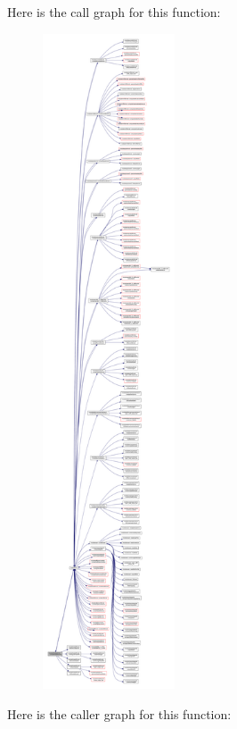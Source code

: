 Here is the call graph for this function\+:\nopagebreak
\begin{figure}[H]
\begin{center}
\leavevmode
\includegraphics[height=550pt]{namespacemoduleihradarformat_a98ed94c78a186e13367d60ca010104fb_cgraph}
\end{center}
\end{figure}
Here is the caller graph for this function\+:\nopagebreak
